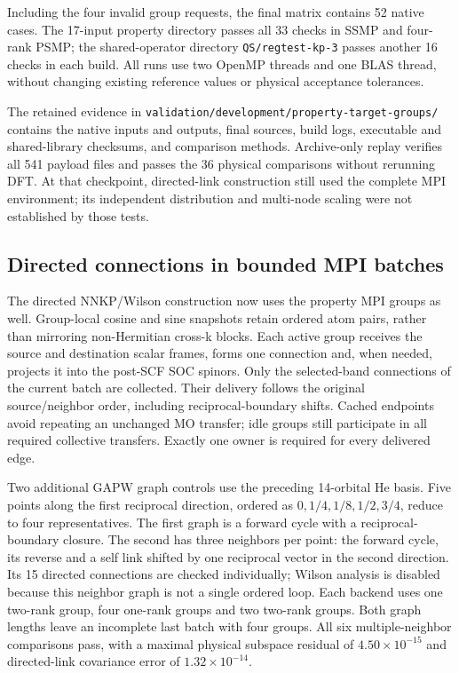 \documentclass[11pt]{article}
\begin{document}
Including the four invalid group requests, the final matrix contains
52 native cases. The 17-input property directory passes all 33 checks
in SSMP and four-rank PSMP; the shared-operator directory
\texttt{QS/regtest-kp-3} passes another 16 checks in each build.
All runs use two OpenMP threads and one BLAS thread, without changing
existing reference values or physical acceptance tolerances.

The retained evidence in
\nolinkurl{validation/development/property-target-groups/}
contains the native inputs and outputs, final sources, build logs,
executable and shared-library checksums, and comparison methods.
Archive-only replay verifies all 541 payload files and passes the
36 physical comparisons without rerunning DFT. At that checkpoint,
directed-link construction still used the complete MPI environment;
its independent distribution and multi-node scaling were not
established by those tests.

\subsection{Directed connections in bounded MPI batches}
The directed NNKP/Wilson construction now uses the property MPI
groups as well. Group-local cosine and sine snapshots retain
ordered atom pairs, rather than mirroring non-Hermitian cross-k
blocks. Each active group receives the source and destination
scalar frames, forms one connection and, when needed, projects it
into the post-SCF SOC spinors. Only the selected-band connections
of the current batch are collected. Their delivery follows the
original source/neighbor order, including reciprocal-boundary
shifts. Cached endpoints avoid repeating an unchanged MO transfer;
idle groups still participate in all required collective transfers.
Exactly one owner is required for every delivered edge.

Two additional GAPW graph controls use the preceding 14-orbital
He basis. Five points along the first reciprocal direction,
ordered as $0,1/4,1/8,1/2,3/4$, reduce to four representatives.
The first graph is a forward cycle with a reciprocal-boundary
closure. The second has three neighbors per point: the forward
cycle, its reverse and a self link shifted by one reciprocal
vector in the second direction. Its 15 directed connections are
checked individually; Wilson analysis is disabled because this
neighbor graph is not a single ordered loop. Each backend uses
one two-rank group, four one-rank groups and two two-rank groups.
Both graph lengths leave an incomplete last batch with four groups.
All six multiple-neighbor comparisons pass, with a maximal physical
subspace residual of $4.50\times10^{-15}$ and directed-link
covariance error of $1.32\times10^{-14}$.
\end{document}
